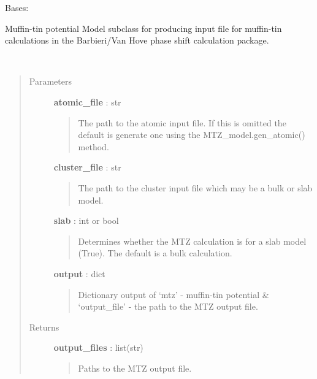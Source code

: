 \documentclass[letterpaper,10pt,english]{sphinxmanual}
\begin{document}

\begin{fulllineitems}
\label{modules:phaseshifts.model.MTZ_model}
Bases: {\hyperref[modules:phaseshifts.model.Model]{}}

Muffin-tin potential Model subclass for producing input file 
for muffin-tin calculations in the Barbieri/Van Hove phase 
shift calculation package.

\begin{fulllineitems}
\label{modules:phaseshifts.model.MTZ_model.calculate_MTZ}~\begin{quote}\begin{description}
\item[{Parameters}] \leavevmode
\textbf{atomic\_file} : str
\begin{quote}

The path to the atomic input file. If this is omitted the default
is generate one using the MTZ\_model.gen\_atomic() method.
\end{quote}

\textbf{cluster\_file} : str
\begin{quote}

The path to the cluster input file which may be a bulk or slab 
model.
\end{quote}

\textbf{slab} : int or bool
\begin{quote}

Determines whether the MTZ calculation is for a slab model (True).
The default is a bulk calculation.
\end{quote}

\textbf{output} : dict
\begin{quote}

Dictionary output of `mtz' - muffin-tin potential \& `output\_file'
- the path to the MTZ output file.
\end{quote}

\item[{Returns}] \leavevmode
\textbf{output\_files} : list(str)
\begin{quote}

Paths to the MTZ output file.
\end{quote}


\end{description}
\end{quote}
\end{fulllineitems}
\end{fulllineitems}
\end{document}
